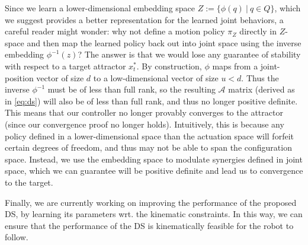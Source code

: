 \documentclass[letterpaper, 10 pt, journal, twoside, fleqn]{IEEEtran}
\begin{document}
Since we learn a lower-dimensional embedding space $Z := \{\phi(q) ~|~q \in Q\}$, which we suggest provides a better representation for the learned joint behaviors, a careful reader might wonder: why not define a motion policy $\pi_Z$ directly in $Z$-space and then map the learned policy back out into joint space using the inverse embedding $\phi^{-1}(z)$? The answer is that we would lose any guarantee of stability with respect to a target attractor $x_t^*$. By construction, $\phi$ maps from a joint-position vector of size $d$ to a low-dimensional vector of size $u<d$. Thus the inverse $\phi^{-1}$ must be of less than full rank, so the resulting $\mathcal{A}$ matrix (derived as in \eqref{eq:ds}) will also be of less than full rank, and thus no longer positive definite. This means that our controller no longer provably converges to the attractor (since our convergence proof no longer holds). Intuitively, this is because any policy defined in a lower-dimensional space than the actuation space will forfeit certain degrees of freedom, and thus may not be able to span the configuration space. Instead, we use the embedding space to modulate synergies defined in joint space, which we can guarantee will be positive definite and lead us to convergence to the target.

Finally,  we are currently working on improving the performance of the proposed DS, by learning its parameters wrt. the kinematic constraints. In this way, we can ensure that the performance of the DS is kinematically feasible for the robot to  follow.
\end{document}
